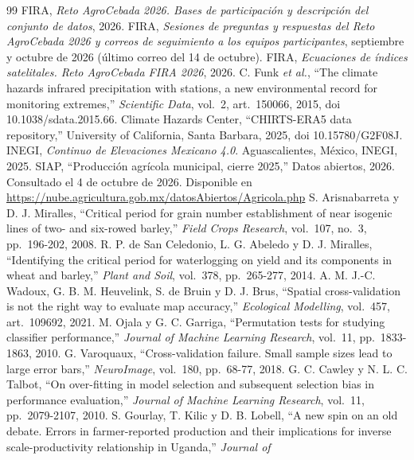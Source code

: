 \begin{thebibliography}{99}
 FIRA, \emph{Reto AgroCebada 2026. Bases de participación y descripción del conjunto de datos},
  2026.
 FIRA, \emph{Sesiones de preguntas y respuestas del Reto AgroCebada 2026 y correos de seguimiento a los equipos participantes}, septiembre y octubre de 2026 (último correo del 14 de octubre).
 FIRA, \emph{Ecuaciones de índices satelitales. Reto AgroCebada FIRA 2026}, 2026.
 C. Funk \emph{et al.}, ``The climate hazards infrared precipitation with stations, a new
  environmental record for monitoring extremes,'' \emph{Scientific Data}, vol.~2, art.~150066, 2015,
  doi 10.1038/sdata.2015.66.
 Climate Hazards Center, ``CHIRTS-ERA5 data repository,'' University of California, Santa
  Barbara, 2025, doi 10.15780/G2F08J.
 INEGI, \emph{Continuo de Elevaciones Mexicano 4.0}. Aguascalientes, México, INEGI, 2025.
 SIAP, ``Producción agrícola municipal, cierre 2025,'' Datos abiertos, 2026. Consultado el 4 de
  octubre de 2026. Disponible en \url{https://nube.agricultura.gob.mx/datosAbiertos/Agricola.php}
 S. Arisnabarreta y D. J. Miralles, ``Critical period for grain number establishment of
  near isogenic lines of two- and six-rowed barley,'' \emph{Field Crops Research}, vol.~107, no.~3, pp.~196-202,
  2008.
 R. P. de San Celedonio, L. G. Abeledo y D. J. Miralles, ``Identifying the critical
  period for waterlogging on yield and its components in wheat and barley,'' \emph{Plant and Soil}, vol.~378,
  pp.~265-277, 2014.
 A. M. J.-C. Wadoux, G. B. M. Heuvelink, S. de Bruin y D. J. Brus, ``Spatial cross-validation
  is not the right way to evaluate map accuracy,'' \emph{Ecological Modelling}, vol.~457, art.~109692, 2021.
 M. Ojala y G. C. Garriga, ``Permutation tests for studying classifier performance,''
  \emph{Journal of Machine Learning Research}, vol.~11, pp.~1833-1863, 2010.
 G. Varoquaux, ``Cross-validation failure. Small sample sizes lead to large error bars,''
  \emph{NeuroImage}, vol.~180, pp.~68-77, 2018.
 G. C. Cawley y N. L. C. Talbot, ``On over-fitting in model selection and subsequent selection
  bias in performance evaluation,'' \emph{Journal of Machine Learning Research}, vol.~11, pp.~2079-2107, 2010.
 S. Gourlay, T. Kilic y D. B. Lobell, ``A new spin on an old debate. Errors in farmer-reported
  production and their implications for inverse scale-productivity relationship in Uganda,'' \emph{Journal of
}
\end{thebibliography}
